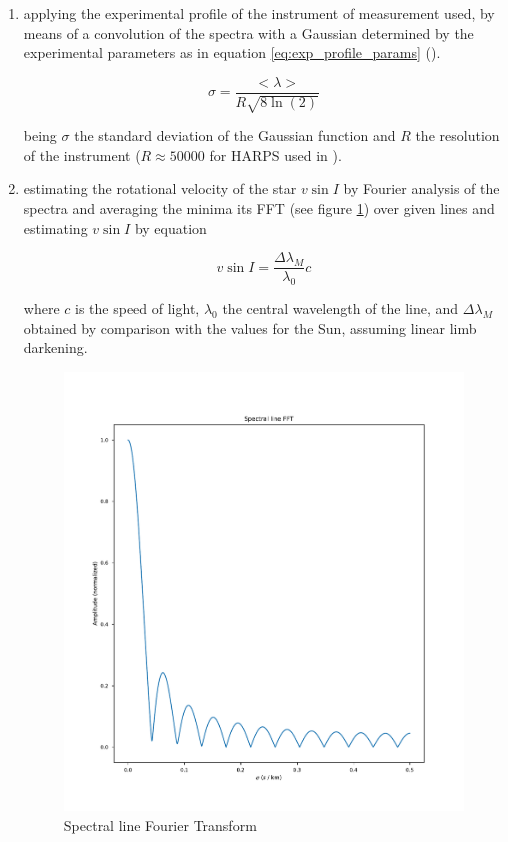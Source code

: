 \documentclass{aa}
\begin{document}
\begin{enumerate}
\item applying the experimental profile of
  the instrument of measurement used, by means of a convolution of the spectra
  with a Gaussian determined by the experimental parameters as in equation
  \ref{eq:exp_profile_params} (\cite{monteiro_sebenta_2019}).

  \begin{equation}
    \label{eq:exp_profile_params}
    \sigma = \frac{<\lambda>}{R \sqrt{8 \ln (2)}}
  \end{equation}

  being $\sigma$ the standard deviation of the Gaussian function and $R$ the
  resolution of the instrument ($R \approx 50000$ for HARPS used in \cite{tsantaki_deriving_2013}).
\item estimating the rotational velocity of the star $v \sin I$ by Fourier analysis
  of the spectra and averaging the minima its FFT (see figure
  \ref{fig:line_fft}) over given lines and estimating $v \sin I$ by equation 

  \begin{equation}
    \label{eq:vsinI}
    v \sin I = \frac{\Delta \lambda_M}{\lambda_0} c
  \end{equation}

  where $c$ is the speed of light, $\lambda_0$ the central wavelength of the
  line, and $\Delta \lambda_M$ obtained by comparison with the values for the
  Sun, assuming linear limb darkening. \cite{monteiro_sebenta_2019}

  \begin{figure}[h]
    \centering
    \includegraphics[width=\linewidth]{line_fft.pdf}
    \caption{Spectral line Fourier Transform}
    \label{fig:line_fft}
  \end{figure}
 

\end{enumerate}
\end{document}
